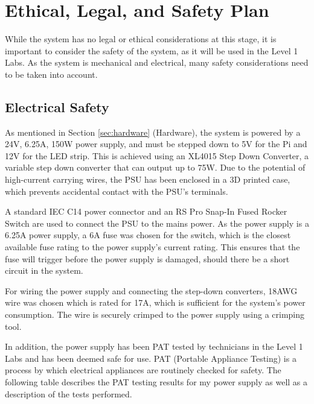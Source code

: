 \section{Ethical, Legal, and Safety Plan}
While the system has no legal or ethical considerations at this stage, it is important to consider the safety of the system,
as it will be used in the Level 1 Labs. As the system is mechanical and electrical, many safety considerations need to be taken into account.
\subsection{Electrical Safety}
As mentioned in Section \ref{sec:hardware} (Hardware), the system is powered by a 24V, 6.25A, 150W power supply, and must be stepped down to 5V for the Pi and 12V for the LED strip. This is achieved using an XL4015 Step Down Converter\cite{xl4015}, a variable step down converter that can output up to 75W.
Due to the potential of high-current carrying wires, the PSU has been enclosed in a 3D printed case, which prevents accidental contact with the PSU's terminals.

A standard IEC C14 power connector and an RS Pro Snap-In Fused Rocker Switch\cite{rsproc14switch} are used to connect the PSU to the mains power.
As the power supply is a 6.25A power supply, a 6A fuse was chosen for the switch, which is the closest available fuse rating to the power supply's
current rating. This ensures that the fuse will trigger before the power supply is damaged, should there be a short circuit in the system.

For wiring the power supply and connecting the step-down converters, 18AWG wire was chosen which is rated for 17A\cite{18awgwire}, which is sufficient
for the system's power consumption. The wire is securely crimped to the power supply using a crimping tool.

In addition, the power supply has been PAT tested by technicians in the Level 1 Labs and has been deemed safe for use.
PAT (Portable Appliance Testing) is a process by which electrical appliances are routinely checked for safety\cite{patwiki}\cite{patspec}.
The following table describes the PAT testing results for my power supply as well as a description of the tests performed.

